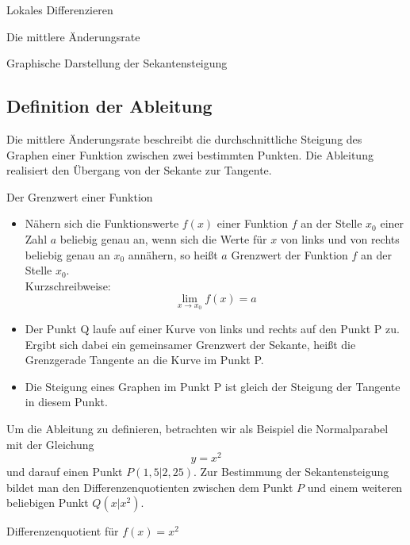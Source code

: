\begin{section}{Lokales Differenzieren}
\begin{subsection}{Die mittlere Änderungsrate}
\begin{bsp}{Graphische Darstellung der Sekantensteigung}{}
\begin{center}
\end{center}
\end{bsp}
\end{subsection}
\subsection{Definition der Ableitung}
Die mittlere Änderungsrate beschreibt die durchschnittliche Steigung des Graphen einer Funktion zwischen zwei bestimmten Punkten. Die Ableitung realisiert den Übergang von der Sekante zur Tangente.
\begin{merke}{Der Grenzwert einer Funktion}{}
\begin{itemize}
 \item Nähern sich die Funktionswerte $f(x)$ einer Funktion $f$ an der Stelle $x_0$ einer Zahl $a$ beliebig genau an, wenn sich die Werte für $x$ von links und von rechts beliebig genau an $x_0$ annähern, so heißt $a$ Grenzwert der Funktion $f$ an der Stelle $x_0$. \\Kurzschreibweise: $$\lim_{x \rightarrow x_0} f(x)= a$$ 
 \item Der Punkt Q laufe auf einer Kurve von links und rechts auf den Punkt P zu. Ergibt sich dabei ein gemeinsamer Grenzwert der Sekante, heißt die Grenzgerade Tangente an die Kurve im Punkt P.
 \item Die Steigung eines Graphen im Punkt P ist gleich der Steigung der Tangente in diesem Punkt.
\end{itemize}
\end{merke}
Um die Ableitung zu definieren, betrachten wir als Beispiel die Normalparabel mit der Gleichung $$ y=x^2 $$ und darauf einen Punkt $P(1,5|2,25)$. Zur Bestimmung der Sekantensteigung bildet man den Differenzenquotienten zwischen dem Punkt $P$ und einem weiteren beliebigen Punkt $Q(x|x^2)$. 
\begin{bem*}{Differenzenquotient für $f(x) =x^2 $}
  

\end{bem*}
\end{section}
